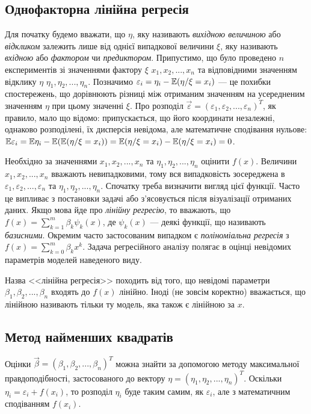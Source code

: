\subsection{Однофакторна лінійна регресія}
Для початку будемо вважати, що $\eta$, яку називають \emph{вихідною величиною} або \emph{відкликом} залежить лише від однієї випадкової величини $\xi$,
яку називають \emph{вхідною} або \emph{фактором} чи \emph{предиктором}. Припустимо,
що було проведено $n$ експериментів зі значеннями фактору $\xi$ $x_1, x_2, ..., x_n$ та відповідними
значенням відклику $\eta$ $\eta_1, \eta_2, ..., \eta_n$. Позначимо
$\varepsilon_i = \eta_i - \mathbb{E}(\eta / \xi = x_i)$ --- це похибки спостережень, що дорівнюють різниці
між отриманим значенням на усередненим значенням $\eta$ при цьому значенні $\xi$.
Про розподіл $\vec{\varepsilon} = (\varepsilon_1, \varepsilon_2, ..., \varepsilon_n)^T$, як правило, мало що відомо:
припускається, що його координати незалежні, однаково розподілені, їх дисперсія невідома, але математичне сподівання нульове:
$\mathbb{E}\varepsilon_i = \mathbb{E}\eta_i - \mathbb{E}(\mathbb{E}(\eta / \xi = x_i)) = \mathbb{E}(\eta / \xi = x_i) - \mathbb{E}(\eta / \xi = x_i) = 0$.

Необхідно за значеннями $x_1, x_2, ..., x_n$ та $\eta_1, \eta_2, ..., \eta_n$ оцінити $f(x)$.
Величини $x_1, x_2, ..., x_n$ вважають невипадковими, тому вся випадковість зосереджена в
$\varepsilon_1, \varepsilon_2, ..., \varepsilon_n$ та $\eta_1, \eta_2, ..., \eta_n$.
Спочатку треба визначити вигляд цієї функції. Часто це випливає з постановки задачі або з'ясовується після візуалізації отриманих даних.
Якщо мова йде про \emph{лінійну регресію}, то вважають, що
$f(x) = \sum\limits_{k=1}^m \beta_k \psi_k(x)$, де $\psi_k(x)$ --- деякі функції, що називають \emph{базисними}.
Окремим часто застосованим випадком є \emph{поліноміальна регресія} з
$f(x) = \sum\limits_{k=0}^m \beta_k x^k$. Задача регресійного аналізу полягає в оцінці невідомих параметрів моделей наведеного виду.
\begin{remark}
    Назва <<лінійна регресія>> походить від того, що невідомі параметри $\beta_1, \beta_2, ..., \beta_n$ входять до $f(x)$ лінійно.
    Іноді (не зовсім коректно) вважається, що лінійною називають тільки ту модель, яка також
    є лінійною за $x$.
\end{remark}

\subsection{Метод найменших квадратів}
Оцінки $\vec{\beta} = (\beta_1, \beta_2, ..., \beta_n)^T$ можна знайти за допомогою методу максимальної правдоподібності,
застосованого до вектору $\eta = \left(\eta_1, \eta_2, ..., \eta_n\right)^T$.
Оскільки $\eta_i = \varepsilon_i + f(x_i)$, то розподіл $\eta_i$ буде таким самим, як 
$\varepsilon_i$, але з математичним сподіванням $f(x_i)$.

